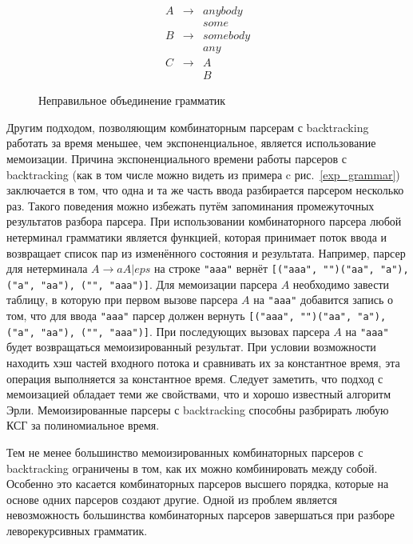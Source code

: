 \documentclass[times]{itmo-student-thesis}
\begin{document}
\begin{figure}[!h]
    \caption{Неправильное объединение грамматик}\label{uncomposable_grammar}
    \[
        \begin{array}{lll}
            A & \to & anybody \\
              &     & some  \\
            B & \to & somebody \\
              &     & any  \\
            C & \to & A  \\
              &     & B
        \end{array}
    \]
\end{figure}

Другим подходом, позволяющим комбинаторным парсерам с backtracking работать за время меньшее, чем экспоненциальное,
является использование мемоизации. Причина экспоненциального времени работы парсеров с backtracking (как в том числе
можно видеть из примера c рис.~\ref{exp_grammar}) заключается в том, что одна и та же часть ввода разбирается
парсером несколько раз. Такого поведения можно избежать путём запоминания промежуточных результатов разбора парсера.
При использовании комбинаторного парсера любой нетерминал грамматики является функцией, которая принимает поток ввода и
возвращает список пар из изменённого состояния и результата. Например, парсер для нетерминала $A \to aA | eps$ на
строке \lstinline{"aaa"} вернёт \lstinline{[("aaa", "")("aa", "a"), ("a", "aa"), ("", "aaa")]}. Для мемоизации парсера
$A$ необходимо завести таблицу, в которую при первом вызове парсера $A$ на
\lstinline{"aaa"} добавится запись о том, что для ввода \lstinline{"aaa"} парсер должен вернуть
\lstinline{[("aaa", "")("aa", "a"), ("a", "aa"), ("", "aaa")]}. При последующих вызовах парсера $A$ на \lstinline{"aaa"}
будет возвращаться мемоизированный результат. При условии возможности находить хэш частей входного потока и сравнивать
их за константное время, эта операция выполняется за константное время. Следует заметить, что подход с мемоизацией
обладает теми же свойствами, что и хорошо известный алгоритм Эрли\cite{norvig_techniques_1991}. Мемоизированные парсеры с
backtracking способны разбрирать любую КСГ за полиномиальное время.

Тем не менее большинство мемоизированных комбинаторных парсеров с backtracking ограничены в том, как их можно
комбинировать между собой. Особенно это касается комбинаторных парсеров высшего порядка, которые на основе одних
парсеров создают другие. Одной из проблем является невозможность большинства комбинаторных парсеров завершаться при
разборе леворекурсивных грамматик.
\end{document}
